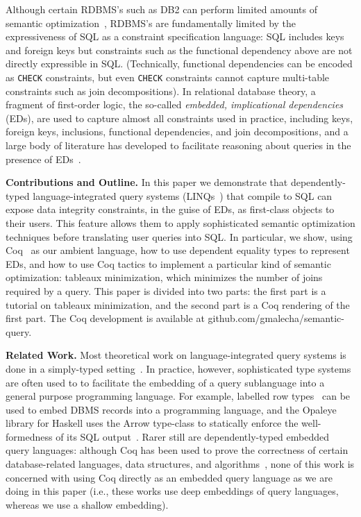 \documentclass[preprint]{sigplanconf}
\begin{document}
Although certain RDBMS's such as DB2 can perform limited amounts of semantic optimization~\cite{Cheng:1999:ITS:645925.671357}, RDBMS's are fundamentally limited by the expressiveness of SQL as a constraint specification language: SQL includes keys and foreign keys but constraints such as the functional dependency above are not directly expressible in SQL.  (Technically, functional dependencies can be encoded as {\tt CHECK} constraints, but even {\tt CHECK} constraints cannot capture multi-table constraints such as join decompositions).  In relational database theory, a fragment of first-order logic, the so-called {\it embedded, implicational dependencies} (EDs), are used to capture almost all constraints used in practice, including keys, foreign keys, inclusions, functional dependencies, and join decompositions, and a large body of literature has developed to facilitate reasoning about queries in the presence of EDs~\cite{Popa99anequational}. 

{\bf Contributions and Outline.} In this paper we demonstrate that dependently-typed language-integrated query systems (LINQs~\cite{monad}) that compile to SQL can expose data integrity constraints, in the guise of EDs, as first-class objects to their users. This feature allows them to apply sophisticated semantic optimization techniques before translating user queries into SQL.  In particular, we show, using Coq~\cite{coq:coq} as our ambient language, how to use dependent equality types to represent EDs, and how to use Coq tactics to implement a particular kind of semantic optimization: tableaux minimization, which minimizes the number of joins required by a query.  This paper is divided into two parts: the first part is a tutorial on tableaux minimization, and the second part is a Coq rendering of the first part. The Coq development is available at {\sf github.com/gmalecha/semantic-query}.

{\bf Related Work.} Most theoretical work on language-integrated query systems is done in a simply-typed setting~\cite{tannen:1992:NEQ:645500.655920}.  In practice, however, sophisticated type systems are often used to to facilitate the embedding of a query sublanguage into a general purpose programming language.  For example, labelled row types~\cite{mpj:jones1996a} can be used to embed DBMS records into a programming language, and the Opaleye library for Haskell uses the Arrow type-class to statically enforce the well-formedness of its SQL output~\cite{opaleye}.  Rarer still are dependently-typed embedded query languages: although Coq has been used to prove the correctness of certain database-related languages, data structures, and algorithms~\cite{DBLP:conf/popl/DelawarePGC15,Malecha:2010:TVR:1706299.1706329,coqdb}, none of this work is concerned with using Coq directly as an embedded query language as we are doing in this paper (i.e., these works use deep embeddings of query languages, whereas we use a shallow embedding).  
\end{document}
